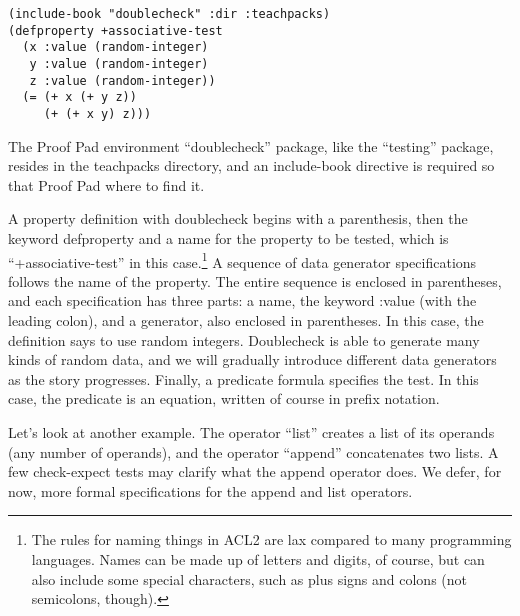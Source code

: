 \begin{Verbatim}
(include-book "doublecheck" :dir :teachpacks)
(defproperty +associative-test
  (x :value (random-integer)
   y :value (random-integer)
   z :value (random-integer))
  (= (+ x (+ y z))
     (+ (+ x y) z)))
\end{Verbatim}

The Proof Pad environment ``doublecheck'' package,
like the ``testing'' package,
resides in the
teachpacks directory,
and an include-book directive is required so that Proof Pad where to find it.

A property definition with
doublecheck begins with a parenthesis, then the keyword
defproperty and a name for the property to be tested,
which is ``+associative-test'' in this case.\footnote{The
rules for naming things in ACL2 are lax compared to many
programming languages. Names can be made up of letters and digits, of course,
but can also include some special characters,
such as plus signs and colons (not semicolons, though).}
A sequence of data generator specifications follows the name of the property.
The entire sequence is enclosed in parentheses,
and each specification has three parts: a name, the keyword :value (with the leading colon),
and a generator, also enclosed in parentheses.
In this case, the definition says to use random integers.
Doublecheck is able to generate many kinds of random data,
and we will gradually introduce different data generators as the story progresses.
Finally, a predicate formula specifies the test.
In this case, the predicate is an equation,
written of course in prefix notation.

Let's look at another example.
\label{list-op-informal}
The operator ``list'' creates a list of its operands
(any number of operands), and
\label{append-op-informal}
the operator ``append''
concatenates two lists.
A few check-expect tests may clarify what the append operator does.
We defer, for now, more formal specifications for the append and list operators.

